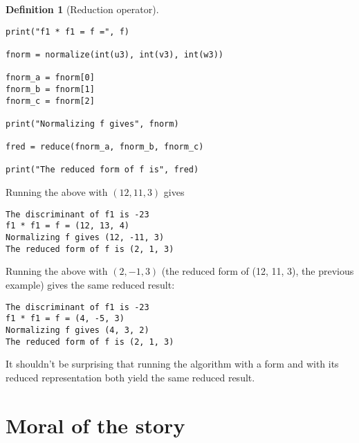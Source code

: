 \documentclass{article}
\theoremstyle{definition}
\newtheorem{definition}{Definition}[section]
\theoremstyle{theorem}
\theoremstyle{example}
\theoremstyle{corollary}
\begin{document}
\begin{definition}[Reduction operator]
\begin{verbatim}
print("f1 * f1 = f =", f)

fnorm = normalize(int(u3), int(v3), int(w3))

fnorm_a = fnorm[0]
fnorm_b = fnorm[1]
fnorm_c = fnorm[2]

print("Normalizing f gives", fnorm)

fred = reduce(fnorm_a, fnorm_b, fnorm_c)

print("The reduced form of f is", fred)
\end{verbatim}

\bigskip

\hline

\bigskip

Running the above with \((12, 11, 3)\) gives

\begin{verbatim}
The discriminant of f1 is -23
f1 * f1 = f = (12, 13, 4)
Normalizing f gives (12, -11, 3)
The reduced form of f is (2, 1, 3)
\end{verbatim}

\bigskip

Running the above with \((2, -1, 3)\) (the reduced form of (12, 11, 3), the previous example) gives the same reduced result:

\begin{verbatim}
The discriminant of f1 is -23
f1 * f1 = f = (4, -5, 3)
Normalizing f gives (4, 3, 2)
The reduced form of f is (2, 1, 3)
\end{verbatim}

\bigskip

It shouldn't be surprising that running the algorithm with a form and with its reduced representation both yield the same reduced result.






\bigskip










\section{Moral of the story}

\bigskip


\end{definition}
\end{document}
